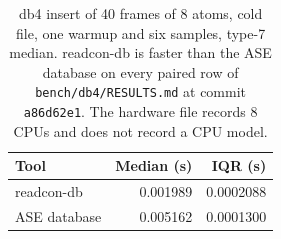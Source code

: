 \begin{table}[tbp]
\centering
\scriptsize
\caption{db4 insert of 40 frames of 8 atoms, cold file, one warmup and six samples, type-7 median.
readcon-db is faster than the ASE database on every paired row of \texttt{bench/db4/RESULTS.md} at commit \texttt{a86d62e1}.
The hardware file records 8 CPUs and does not record a CPU model.}
\label{tab:db4}
\begin{tabular}{@{}lrr@{}}
\toprule
Tool & Median (s) & IQR (s) \\
\midrule
readcon-db & 0.001989 & 0.0002088 \\
ASE database & 0.005162 & 0.0001300 \\
\bottomrule
\end{tabular}
\end{table}
